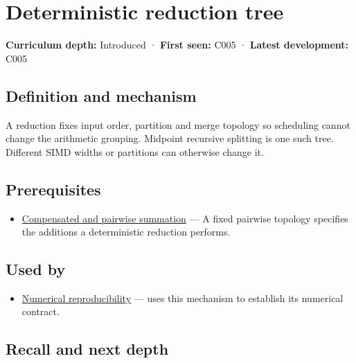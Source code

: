 \hypertarget{appendix-4c8e0238e7ee}{}\label{referencestart:appendix-4c8e0238e7ee}
\section{Deterministic reduction tree}\label{appendix-4c8e0238e7ee-deterministic-reduction-tree}

\textbf{Curriculum depth:} Introduced · \textbf{First seen:} C005 · \textbf{Latest development:} C005

\begin{allmightroledefinition}

\subsection{Definition and mechanism}\label{appendix-4c8e0238e7ee-definition-and-mechanism}

A reduction fixes input order, partition and merge topology so scheduling cannot change the arithmetic grouping. Midpoint recursive splitting is one such tree. Different SIMD widths or partitions can otherwise change it.

\end{allmightroledefinition}

\subsection{Prerequisites}\label{appendix-4c8e0238e7ee-prerequisites}

\begin{itemize}
\tightlist
\item
  \hyperref[appendix-df318da57389]{Compensated and pairwise summation} --- A fixed pairwise topology specifies the additions a deterministic reduction performs.
\end{itemize}

\subsection{Used by}\label{appendix-4c8e0238e7ee-used-by}

\begin{itemize}
\tightlist
\item
  \hyperref[appendix-5f1a2c3f97ff]{Numerical reproducibility} --- uses this mechanism to establish its numerical contract.
\end{itemize}

\subsection{Recall and next depth}\label{appendix-4c8e0238e7ee-recall-and-next-depth}


